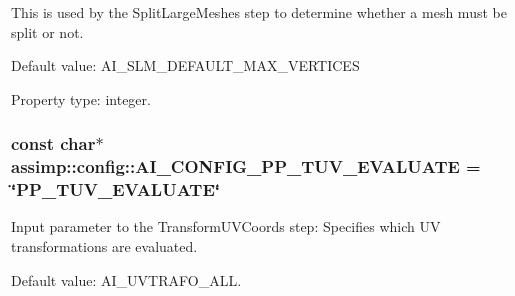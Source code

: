 This is used by the {\ttfamily Split\+Large\+Meshes} step to determine whether a mesh must be split or not.

Default value\+: A\+I\+\_\+\+S\+L\+M\+\_\+\+D\+E\+F\+A\+U\+L\+T\+\_\+\+M\+A\+X\+\_\+\+V\+E\+R\+T\+I\+C\+E\+S

Property type\+: integer. \hypertarget{namespaceassimp_1_1config_a7caca533ad5275383a170f49b9498def}{
\subsubsection[{A\+I\+\_\+\+C\+O\+N\+F\+I\+G\+\_\+\+P\+P\+\_\+\+T\+U\+V\+\_\+\+E\+V\+A\+L\+U\+A\+T\+E}]{\setlength{\rightskip}{0pt plus 5cm}const char$\ast$ assimp\+::config\+::\+A\+I\+\_\+\+C\+O\+N\+F\+I\+G\+\_\+\+P\+P\+\_\+\+T\+U\+V\+\_\+\+E\+V\+A\+L\+U\+A\+T\+E = \char`\"{}P\+P\+\_\+\+T\+U\+V\+\_\+\+E\+V\+A\+L\+U\+A\+T\+E\char`\"{}}}\label{namespaceassimp_1_1config_a7caca533ad5275383a170f49b9498def}
Input parameter to the {\ttfamily Transform\+U\+V\+Coords} step\+: Specifies which U\+V transformations are evaluated.

Default value\+: A\+I\+\_\+\+U\+V\+T\+R\+A\+F\+O\+\_\+\+A\+L\+L.

